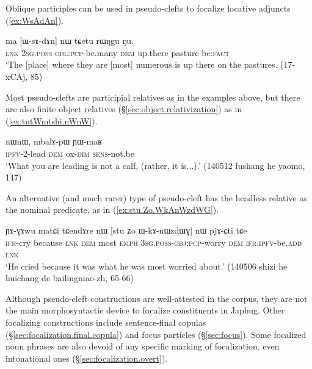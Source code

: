 Oblique participles can be used in pseudo-clefts to focalize locative adjuncts (\ref{ex:WsAdAn}).
 
\begin{exe}
\ex \label{ex:WsAdAn}
\gll  ma [ɯ-sɤ-dɤn] nɯ tɕetu rɯŋgu ŋu. \\
\textsc{lnk} \textsc{2sg}.\textsc{poss}-\textsc{obl}:\textsc{pcp}-be.many \textsc{dem} up.there pasture be:\textsc{fact} \\
\glt `The [place] where they are [most] numerous is up there on the pastures. (17-xCAj, 85)
\end{exe}

 Most pseudo-clefts are participial relatives as in the examples above, but there are also finite object relatives (§\ref{sec:object.relativization}) as in (\ref{ex:tutWmtshi.nWnW}).
 
\begin{exe}
\ex \label{ex:tutWmtshi.nWnW}
\gll  [tu-tɯ-mtsʰi] nɯnɯ, mbalɤ-pɯ ɲɯ-maʁ \\
\textsc{ipfv}-2-lead \textsc{dem} ox-\textsc{dim} \textsc{sens}-not.be \\
\glt `What you are leading is not a calf, (rather, it is...).' (140512 fushang he yaomo, 147)
\end{exe}

An alternative (and much rarer) type of pseudo-cleft has the headless relative as the nominal predicate, as in (\ref{ex:stu.Zo.WkAnWzdWG}).

\begin{exe}
\ex \label{ex:stu.Zo.WkAnWzdWG}
\gll ɲɤ-ɣɤwu matɕi tɕendɤre nɯ [stu ʑo ɯ-kɤ-nɯzdɯɣ] nɯ pjɤ-ɕti tɕe  \\
\textsc{ifr}-cry because \textsc{lnk} \textsc{dem} most \textsc{emph} \textsc{3sg}.\textsc{poss}-\textsc{obj}:\textsc{pcp}-worry \textsc{dem} \textsc{ifr}.\textsc{ipfv}-be.\textsc{add} \textsc{lnk} \\
\glt `He cried because it was what he was most worried about.' (140506 shizi he huichang de bailingniao-zh, 65-66)
\end{exe}
 
Although pseudo-cleft constructions are well-attested in the corpus, they are not the main morphosyntactic device to focalize constituents in Japhug. Other focalizing constructions include sentence-final copulas (§\ref{sec:focalization.final.copula}) and focus particles (§\ref{sec:focus}). Some focalized noun phrases are also devoid of any specific marking of focalization, even intonational ones (§\ref{sec:focalization.overt}).

